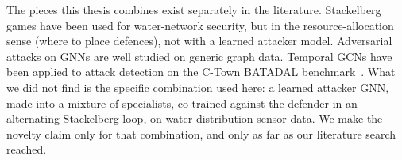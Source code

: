 The pieces this thesis combines exist separately in the literature.
Stackelberg games have been used for water-network security, but
in the resource-allocation sense (where to place defences), not
with a learned attacker model. Adversarial attacks on GNNs are
well studied on generic graph data. Temporal GCNs have been applied
to attack detection on the C-Town BATADAL
benchmark~\cite{tsiami2021cyber}. What we did
not find is the specific combination used here: a learned
attacker GNN, made into a mixture of specialists, co-trained
against the defender in an alternating Stackelberg loop, on water
distribution sensor data. We make the novelty claim only for that
combination, and only as far as our literature search reached.
